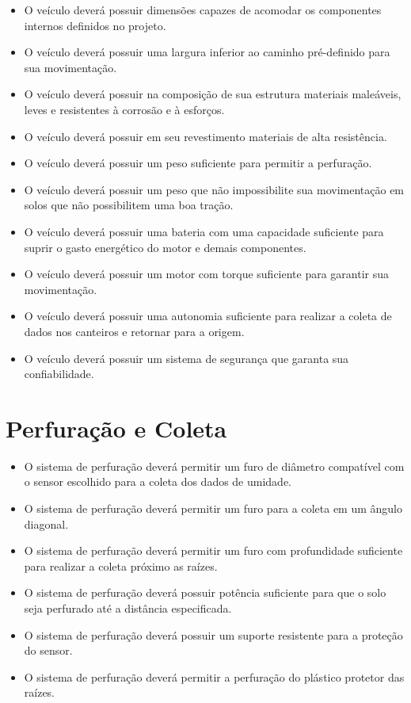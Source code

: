     \begin{itemize}
      \item O veículo deverá possuir dimensões capazes de acomodar os componentes internos definidos no projeto.
      \item O veículo deverá possuir uma largura inferior ao caminho pré-definido para sua movimentação.
      \item O veículo deverá possuir na composição de sua estrutura materiais maleáveis, leves e resistentes à corrosão e à esforços.
      \item O veículo deverá possuir em seu revestimento materiais de alta resistência.
      \item O veículo deverá possuir um peso suficiente para permitir a perfuração.
      \item O veículo deverá possuir um peso que não impossibilite sua movimentação em solos que não possibilitem uma boa tração.
      \item O veículo deverá possuir uma bateria com uma capacidade suficiente para suprir o gasto energético do motor e demais componentes.
      \item O veículo deverá possuir um motor com torque suficiente para garantir sua movimentação.
      \item O veículo deverá possuir uma autonomia suficiente para realizar a coleta de dados nos canteiros e retornar para a origem.
      \item O veículo deverá possuir um sistema de segurança que garanta sua confiabilidade.
    \end{itemize}

  \section{Perfuração e Coleta}

    \begin{itemize}
      \item O sistema de perfuração deverá permitir um furo de diâmetro compatível com o sensor escolhido para a coleta dos dados de umidade.
      \item O sistema de perfuração deverá permitir um furo para a coleta em um ângulo diagonal.
      \item O sistema de perfuração deverá permitir um furo com profundidade suficiente para realizar a coleta próximo as raízes.
      \item O sistema de perfuração deverá possuir potência suficiente para que o solo seja perfurado até a distância especificada.
      \item O sistema de perfuração deverá possuir um suporte resistente para a proteção do sensor.
      \item O sistema de perfuração deverá permitir a perfuração do plástico protetor das raízes.
    \end{itemize}

